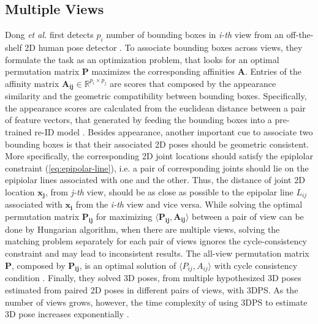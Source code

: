 \subsection{Multiple Views}
Dong \textit{et al.} \cite{dong2019fast} first detects $\mathit{p_i}$ number of bounding boxes in \textit{i-th} view from an off-the-shelf 2D human pose detector \cite{Chen2018CPN}. To associate bounding boxes across views, they formulate the task as an optimization problem, that looks for an optimal permutation matrix $\mathbf{P}$ maximizes the corresponding affinities $\mathbf{A}$. Entries of the affinity matrix $\mathbf{A_{ij}} \in \mathbb{R}^{p_i \times p_j}$ are scores that composed by the appearance similarity and the geometric compatibility between bounding boxes. Specifically, the appearance scores are calculated from the euclidean distance between a pair of feature vectors, that generated by feeding the bounding boxes into a pre-trained re-ID model \cite{zhong2018camera}. Besides appearance,  another important cue to associate two bounding boxes is that their associated 2D poses should be geometric consistent. More specifically, the corresponding 2D joint locations should satisfy the epiplolar constraint (\ref{eq:epipolar-line}), i.e. a pair of corresponding joints should lie on the epipiolar lines associated with one and the other. Thus, the distance of joint 2D location $\mathbf{x_j}$, from \textit{j-th} view, should be as close as possible to the epipolar line $\mathit{L_{ij}}$ associated with $\mathbf{x_{i}}$ from the \textit{i-th} view and vice versa. While solving the optimal permutation matrix $\mathbf{P_{ij}}$ for maximizing $\langle \mathbf{P_{ij}, A_{ij}} \rangle$ between a pair of view can be done by Hungarian algorithm, when there are multiple views, solving the
matching problem separately for each pair of views ignores the cycle-consistency constraint and may lead to inconsistent results. The all-view permutation matrix $\mathbf{P}$, composed by $\mathbf{P_{ij}}$, is an optimal solution of $\langle P_{ij}, A_{ij} \rangle$ with cycle consistency condition \cite{cycle-consistency}. Finally, they solved 3D poses, from multiple hypothesized 3D poses estimated from paired 2D poses in different pairs of views, with 3DPS. As the number of views grows, however, the time complexity of using 3DPS to estimate 3D pose increases exponentially \cite{Chen_2020_CVPR}.

